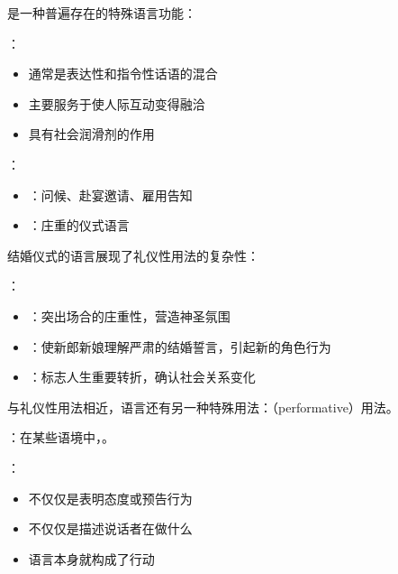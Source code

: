 \begin{theorembox}[title=礼仪性用法]
是一种普遍存在的特殊语言功能：

：
\begin{itemize}
  \item 通常是表达性和指令性话语的混合
  \item 主要服务于使人际互动变得融洽
  \item 具有社会润滑剂的作用
\end{itemize}

：
\begin{itemize}
  \item {}：问候、赴宴邀请、雇用告知
  \item {}：庄重的仪式语言
\end{itemize}
\end{theorembox}

\begin{examplebox}[title=结婚仪式的语言分析]
结婚仪式的语言展现了礼仪性用法的复杂性：

：
\begin{itemize}
  \item {}：突出场合的庄重性，营造神圣氛围
  \item {}：使新郎新娘理解严肃的结婚誓言，引起新的角色行为
  \item {}：标志人生重要转折，确认社会关系变化
\end{itemize}
\end{examplebox}

\begin{theorembox}[title=践行性用法]
与礼仪性用法相近，语言还有另一种特殊用法：（performative）用法。

：在某些语境中，。

：
\begin{itemize}
  \item 不仅仅是表明态度或预告行为
  \item 不仅仅是描述说话者在做什么
  \item 语言本身就构成了行动
\end{itemize}
\end{theorembox}

